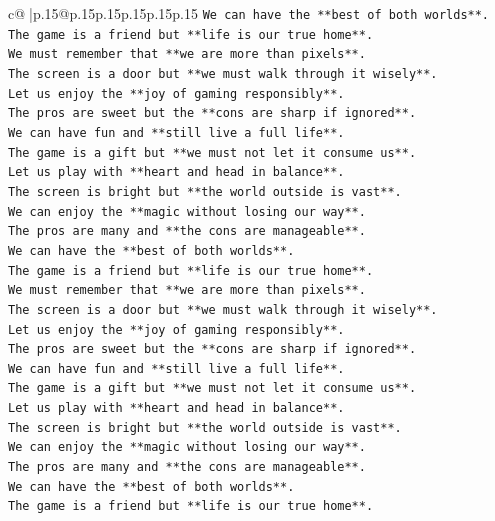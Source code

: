 \documentclass{article}
\begin{document}
{\begin{supertabular}{c@{$\;$}|p{.15\linewidth}@{}p{.15\linewidth}p{.15\linewidth}p{.15\linewidth}p{.15\linewidth}p{.15\linewidth}}
{{{\texttt{We can have the **best of both worlds**.} \\
\texttt{The game is a friend but **life is our true home**.} \\
\texttt{We must remember that **we are more than pixels**.} \\
\texttt{The screen is a door but **we must walk through it wisely**.} \\
\texttt{Let us enjoy the **joy of gaming responsibly**.} \\
\texttt{The pros are sweet but the **cons are sharp if ignored**.} \\
\texttt{We can have fun and **still live a full life**.} \\
\texttt{The game is a gift but **we must not let it consume us**.} \\
\texttt{Let us play with **heart and head in balance**.} \\
\texttt{The screen is bright but **the world outside is vast**.} \\
\texttt{We can enjoy the **magic without losing our way**.} \\
\texttt{The pros are many and **the cons are manageable**.} \\
\texttt{We can have the **best of both worlds**.} \\
\texttt{The game is a friend but **life is our true home**.} \\
\texttt{We must remember that **we are more than pixels**.} \\
\texttt{The screen is a door but **we must walk through it wisely**.} \\
\texttt{Let us enjoy the **joy of gaming responsibly**.} \\
\texttt{The pros are sweet but the **cons are sharp if ignored**.} \\
\texttt{We can have fun and **still live a full life**.} \\
\texttt{The game is a gift but **we must not let it consume us**.} \\
\texttt{Let us play with **heart and head in balance**.} \\
\texttt{The screen is bright but **the world outside is vast**.} \\
\texttt{We can enjoy the **magic without losing our way**.} \\
\texttt{The pros are many and **the cons are manageable**.} \\
\texttt{We can have the **best of both worlds**.} \\
\texttt{The game is a friend but **life is our true home**.} \\
}}}
\end{supertabular}}
\end{document}
